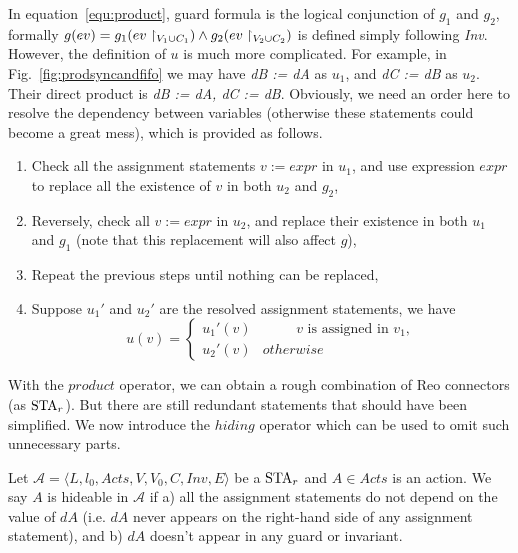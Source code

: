 In equation~\ref{equ:product}, guard formula is the logical conjunction of $g_1$ and $g_2$, formally $g(ev)=g_1(ev\restriction_{V_1\cup C_1})\land g_2(ev\restriction_{V_2\cup C_2})$ is defined simply following \emph{Inv}. However, the definition of $u$ is much more complicated. For example, in Fig.~\ref{fig:prodsyncandfifo} we may have \emph{dB := dA} as $u_1$, and \emph{dC := dB} as $u_2$. Their direct product is \emph{dB := dA, dC := dB}. Obviously, we need an order here to resolve the dependency between variables (otherwise these statements could become a great mess), which is provided as follows.

\begin{enumerate}
    \item Check all the assignment statements $v:=expr$ in $u_1$, and use expression $expr$ to replace all the existence of $v$ in both $u_2$ and $g_2$,
    \item Reversely, check all $v:=expr$ in $u_2$, and replace their existence in both $u_1$ and $g_1$ (note that this replacement will also affect $g$),
    \item Repeat the previous steps until nothing can be replaced,
    \item Suppose $u_1'$ and $u_2'$ are the resolved assignment statements, we have
        \begin{displaymath}
            u(v)=\left\{
            \begin{array}{lr}
                u_1'(v) & \hspace{1cm}\mbox{$v$ is assigned in $v_1$}, \\
                u_2'(v) & otherwise
            \end{array}
            \right.
        \end{displaymath}
\end{enumerate}


With the $product$ operator, we can obtain a rough combination of Reo connectors (as $\mbox{STA}_r$). But there are still redundant statements that should have been simplified. We now introduce the $hiding$ operator which can be used to omit such unnecessary parts.

\begin{definition}
    Let $\mathscr{A}= \langle L, l_0, Acts, V, V_0, C, Inv, E\rangle$ be a $\mbox{STA}_r$ and $A\in Acts$ is an action. We say $A$ is hideable in $\mathscr{A}$ if a) all the assignment statements do not depend on the value of $dA$ (i.e. $dA$ never appears on the right-hand side of any assignment statement), and b) $dA$ doesn't appear in any guard or invariant.
\end{definition}

